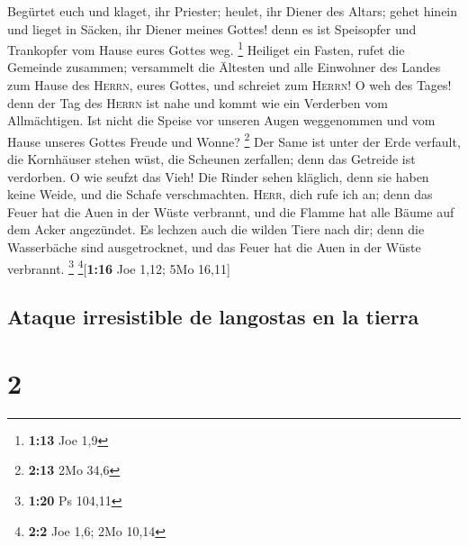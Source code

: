  Begürtet euch und klaget, ihr Priester; heulet, ihr
Diener des Altars; gehet hinein und lieget in Säcken, ihr Diener meines
Gottes! denn es ist Speisopfer und Trankopfer vom Hause eures Gottes
weg. \footnote{\textbf{1:13} Joe 1,9}  Heiliget ein
Fasten, rufet die Gemeinde zusammen; versammelt die Ältesten und alle
Einwohner des Landes zum Hause des \textsc{Herrn}, eures Gottes, und
schreiet zum \textsc{Herrn}!  O weh des Tages! denn der
Tag des \textsc{Herrn} ist nahe und kommt wie ein Verderben vom
Allmächtigen.  Ist nicht die Speise vor unseren Augen
weggenommen und vom Hause unseres Gottes Freude und Wonne? \footnote{\textbf{2:13}
  2Mo 34,6}  Der Same ist unter der Erde verfault, die
Kornhäuser stehen wüst, die Scheunen zerfallen; denn das Getreide ist
verdorben.  O wie seufzt das Vieh! Die Rinder sehen
kläglich, denn sie haben keine Weide, und die Schafe verschmachten.
 \textsc{Herr}, dich rufe ich an; denn das Feuer hat die
Auen in der Wüste verbrannt, und die Flamme hat alle Bäume auf dem Acker
angezündet.  Es lechzen auch die wilden Tiere nach dir;
denn die Wasserbäche sind ausgetrocknet, und das Feuer hat die Auen in
der Wüste verbrannt. \footnote{\textbf{1:20} Ps 104,11}
\footnote{\textbf{2:2} Joe 1,6; 2Mo 10,14}{[}\textbf{1:16} Joe 1,12; 5Mo
16,11{]}

\hypertarget{ataque-irresistible-de-langostas-en-la-tierra}{%
\subsection{Ataque irresistible de langostas en la
tierra}\label{ataque-irresistible-de-langostas-en-la-tierra}}

\hypertarget{section-1}{%
\section{2}\label{section-1}}

